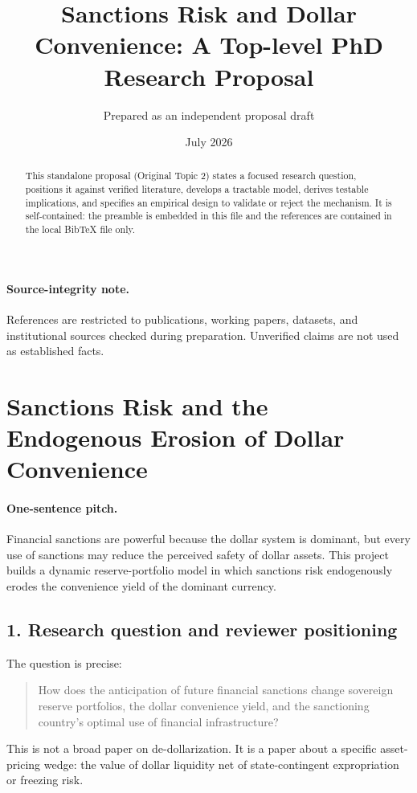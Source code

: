 \documentclass[11pt]{article}
\title{Sanctions Risk and Dollar Convenience: A Top-level PhD Research Proposal}
\author{Prepared as an independent proposal draft}
\date{July 2026}
\begin{document}
\maketitle
\begin{abstract}
This standalone proposal (Original Topic 2) states a focused research question, positions it against verified literature, develops a tractable model, derives testable implications, and specifies an empirical design to validate or reject the mechanism. It is self-contained: the preamble is embedded in this file and the references are contained in the local BibTeX file only.
\end{abstract}

\paragraph{Source-integrity note.} References are restricted to publications, working papers, datasets, and institutional sources checked during preparation. Unverified claims are not used as established facts.

\section{Sanctions Risk and the Endogenous Erosion of Dollar Convenience}

\paragraph{One-sentence pitch.} Financial sanctions are powerful because the dollar system is dominant, but every use of sanctions may reduce the perceived safety of dollar assets. This project builds a dynamic reserve-portfolio model in which sanctions risk endogenously erodes the convenience yield of the dominant currency.

\subsection*{1. Research question and reviewer positioning}
The question is precise:
\begin{quote}
How does the anticipation of future financial sanctions change sovereign reserve portfolios, the dollar convenience yield, and the sanctioning country's optimal use of financial infrastructure?
\end{quote}
This is not a broad paper on de-dollarization. It is a paper about a specific asset-pricing wedge: the value of dollar liquidity net of state-contingent expropriation or freezing risk.
\end{document}
